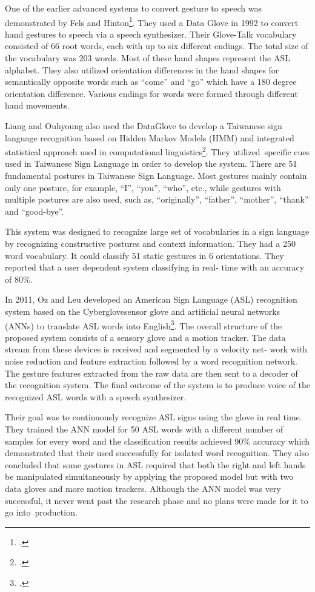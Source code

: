 One of the earlier advanced systems to convert gesture to speech was demonstrated by Fels and Hinton\footcite{Fels1993}. They used a Data Glove in 1992 to convert hand gestures to speech via a speech synthesizer. Their Glove-Talk vocabulary consisted of 66 root words, each with up to six different endings. The total size of the vocabulary was 203 words. Most of these hand shapes represent the ASL alphabet. They also utilized orientation differences in the hand shapes for semantically opposite words such as ``come'' and ``go'' which have a 180 degree orientation difference. Various endings for words were formed through different hand movements. 

Liang and Ouhyoung also used the DataGlove to develop a Taiwanese sign language recognition based on Hidden Markov Models (HMM) and integrated statistical approach used in computational linguistics\footcite{Liang1998}. They utilized specific cues used in Taiwanese Sign Language in order to develop the system. There are 51 fundamental postures in Taiwanese Sign Language. Most gestures mainly contain only one posture, for example, ``I'', ``you'', ``who'', etc., while gestures with multiple postures are also used, such as, ``originally'', ``father'', ``mother'', ``thank'' and ``good-bye''. 

This system was designed to recognize large set of vocabularies in a sign language by recognizing constructive postures and context information. They had a 250 word vocabulary. It could classify 51 static gestures in 6 orientations. They reported that a user dependent system classifying in real- time with an accuracy of 80\%.

In 2011, Oz and Leu developed an American Sign Language (ASL) recognition system based on the Cyberglove\texttrademark sensor glove and artificial neural networks (ANNs) to translate ASL words into English\footcite{Oz2011}. The overall structure of the proposed system consists of a sensory glove and a motion tracker. The data stream from these devices is received and segmented by a velocity net- work with noise reduction and feature extraction followed by a word recognition network. The gesture features extracted from the raw data are then sent to a decoder of the recognition system. The final outcome of the system is to produce voice of the recognized ASL words with a speech synthesizer. 

Their goal was to continuously recognize ASL signs using the glove in real time. They trained the ANN model for 50 ASL words with a different number of samples for every word and the classification results achieved 90\% accuracy which demonstrated that their used successfully for isolated word recognition. They also concluded that some gestures in ASL required that both the right and left hands be manipulated simultaneously by applying the proposed model but with two data gloves and more motion trackers. Although the ANN model was very successful, it never went past the research phase and no plans were made for it to go into production. 


